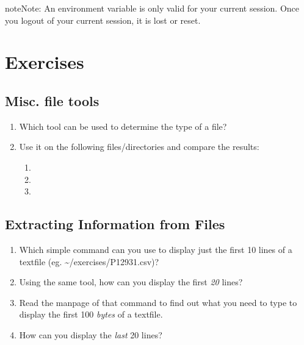 \documentclass[a4paper,11pt,english]{sphinxmanual}
\begin{document}
\begin{notice}{note}{Note:}
An environment variable is only valid for your current session. Once you logout of your current session, it is lost or reset.
\end{notice}


\chapter{Exercises}
\label{exercises/exercises_beginner:exercises}\label{exercises/exercises_beginner::doc}

\section{Misc. file tools}
\label{exercises/exercises_beginner:misc-file-tools}\begin{enumerate}
\item {} 
Which tool can be used to determine the type of a file?

\item {} 
Use it on the following files/directories and compare the results:
\begin{enumerate}
\item {} 

\item {} 
\code{\textasciitilde{}}

\item {} 

\end{enumerate}

\end{enumerate}


\section{Extracting Information from Files}
\label{exercises/exercises_beginner:extracting-information-from-files}\begin{enumerate}
\item {} 
Which simple command can you use to display just the first 10 lines of a textfile (eg. \textasciitilde{}/exercises/P12931.csv)?

\item {} 
Using the same tool, how can you display the first \emph{20} lines?

\item {} 
Read the manpage of that command to find out what you need to type to display the first 100 \emph{bytes} of a textfile.

\item {} 
How can you display the \emph{last} 20 lines?

\end{enumerate}
\end{document}
